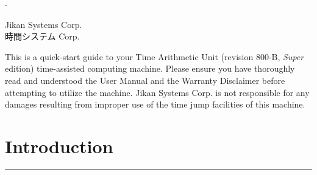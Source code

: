 \documentclass[a5paper,onecolumn,final,10pt]{memoir}
\makeatletter
\let\@copyright@old\copyright
\def\copyright{\makebox[.6ex][l]{\hspace{-.4ex}\textsuperscript{\@copyright@old}}}
\newcommand\machinename%
	{\textsf{TAU-800B \textit{Super}}}
\newcommand\companyname%
	{Jikan Systems Corp.\copyright}
\makeatother
\begin{document}
\frontmatter

\begin{titlingpage}
	\calccentering{\unitlength}
	\begin{adjustwidth*}{\unitlength}{-\unitlength}
		\centering

		\vspace*{4\baselineskip}


		\vfill

		{\footnotesize \companyname \\ 時間システム Corp.\copyright}
	\end{adjustwidth*}
\end{titlingpage}



\thispagestyle{empty}

\begin{footnotesize}
	\noindent
  This is a quick-start guide to your Time Arithmetic Unit (revision 800-B, \textit{Super} edition) time-assisted computing machine.
	Please ensure you have thoroughly read and understood the User Manual and the Warranty Disclaimer before attempting to utilize the machine.
	\companyname{} is not responsible for any damages resulting from improper use of the time jump facilities of this machine.
	\vfill
\end{footnotesize}



\clearpage
\renewcommand\cftchapterfont{\ttfamily}
\renewcommand\cftchapterleader{\ttfamily\cftdotfill{.}}  %
\renewcommand\cftchapterpagefont{\ttfamily}
\tableofcontents*



\mainmatter

\section{Introduction}
\vspace*{-20pt}\rule{\textwidth}{0.8pt}
\end{document}
